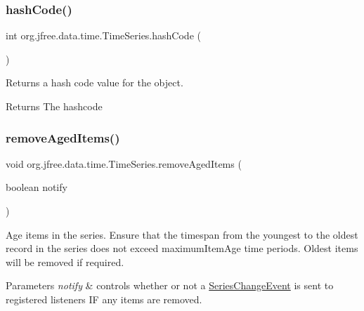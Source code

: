 \subsubsection{\texorpdfstring{hash\+Code()}{hashCode()}}
{\footnotesize\ttfamily int org.\+jfree.\+data.\+time.\+Time\+Series.\+hash\+Code (\begin{DoxyParamCaption}{ }\end{DoxyParamCaption})}

Returns a hash code value for the object.

\begin{DoxyReturn}{Returns}
The hashcode 
\end{DoxyReturn}
\mbox{\label{classorg_1_1jfree_1_1data_1_1time_1_1_time_series_a6d867845d16191792f026af279cdc718}} 
\subsubsection{\texorpdfstring{remove\+Aged\+Items()}{removeAgedItems()}\hspace{0.1cm}{\footnotesize\ttfamily [1/2]}}
{\footnotesize\ttfamily void org.\+jfree.\+data.\+time.\+Time\+Series.\+remove\+Aged\+Items (\begin{DoxyParamCaption}\item[{boolean}]{notify }\end{DoxyParamCaption})}

Age items in the series. Ensure that the timespan from the youngest to the oldest record in the series does not exceed maximum\+Item\+Age time periods. Oldest items will be removed if required.


\begin{DoxyParams}{Parameters}
{\em notify} & controls whether or not a \mbox{\hyperlink{}{Series\+Change\+Event}} is sent to registered listeners IF any items are removed. \\
\hline
\end{DoxyParams}
\mbox{\label{classorg_1_1jfree_1_1data_1_1time_1_1_time_series_a112145d557ccea009e584a47aff01c96}} 
